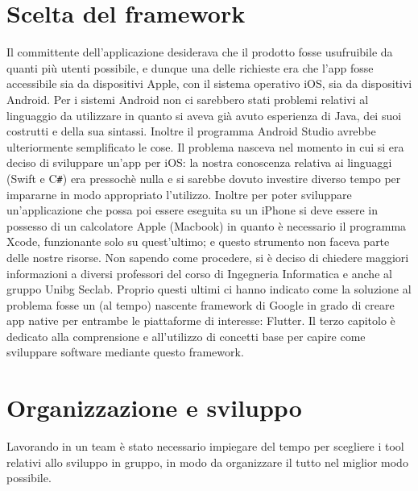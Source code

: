 	\section{Scelta del framework}
	Il committente dell'applicazione desiderava che il prodotto fosse 
	usufruibile  da quanti più utenti possibile, e dunque una delle richieste
	era che l'app fosse accessibile sia da dispositivi Apple, con il sistema
	operativo iOS, sia da dispositivi Android. \newline
	Per i sistemi Android non ci sarebbero stati problemi relativi al linguaggio
	da utilizzare in quanto si aveva già avuto esperienza di Java, dei suoi
	costrutti e della sua sintassi. Inoltre il programma Android Studio avrebbe
	ulteriormente semplificato le cose. Il problema nasceva nel momento in cui
	si era deciso di sviluppare un'app per iOS: la nostra conoscenza relativa
	ai
	linguaggi (Swift e C\verb|#|) era pressochè nulla e si sarebbe dovuto
	investire diverso tempo per impararne in modo appropriato l'utilizzo. 
	Inoltre per poter sviluppare un'applicazione che possa poi essere eseguita su un
	iPhone si deve essere in possesso di un calcolatore Apple (Macbook) in
	quanto è necessario il programma Xcode, funzionante solo su quest'ultimo; e
	questo strumento non faceva parte delle nostre risorse.
	Non
	sapendo come procedere, si è deciso di chiedere maggiori informazioni a
	diversi	professori del corso di Ingegneria Informatica e anche al gruppo
	Unibg Seclab. Proprio questi ultimi ci hanno indicato come la soluzione al
	problema fosse un (al tempo) nascente framework di Google in grado di creare
	app native per entrambe le piattaforme di interesse: Flutter. Il terzo
	capitolo è dedicato alla comprensione e all'utilizzo di concetti base per
	capire come sviluppare software mediante questo framework.
	
	\section{Organizzazione e sviluppo}
	Lavorando in un team è stato necessario impiegare del tempo per scegliere i 
	tool relativi allo sviluppo in gruppo, in modo da organizzare il tutto nel 
	miglior modo possibile.

